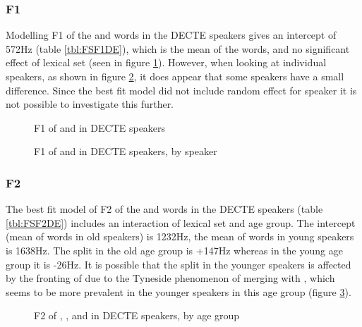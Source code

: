 \documentclass[../../../00.FullDoc/tex/ThesisSkeleton-draft2]{subfiles}
\begin{document}
\subsubsection{F1}
Modelling F1 of the \foot{} and \strutt{} words in the DECTE speakers gives an intercept of 572Hz (table \ref{tbl:FSF1DE}), which is the mean of the \foot{} words, and no significant effect of lexical set (seen in figure \ref{fig:FSF1DE}). However, when looking at individual speakers, as shown in figure \ref{fig:FSF1DE-id}, it does appear that some speakers have a small difference. Since the best fit model did not include random effect for speaker it is not possible to investigate this further.



\begin{figure}
	\centering
	
	\caption{F1 of \foot{} and \strutt{} in DECTE speakers} \label{fig:FSF1DE}
\end{figure}

\begin{figure}
	\centering
	
	\caption{F1 of \foot{} and \strutt{} in DECTE speakers, by speaker} \label{fig:FSF1DE-id}
\end{figure}


\subsubsection{F2}
The best fit model of F2 of the \foot{} and \strutt{} words in the DECTE speakers (table \ref{tbl:FSF2DE}) includes an interaction of lexical set and age group. The intercept (mean of \foot{} words in old speakers) is 1232Hz, the mean of \foot{} words in young speakers is 1638Hz. The split in the old age group is +147Hz whereas in the young age group it is -26Hz. It is possible that the split in the younger speakers is affected by the  fronting of \foot{} due to the Tyneside phenomenon of \foot{} merging with \goose{}, which seems to be more prevalent in the younger speakers in this age group (figure \ref{fig:FSGF2DE-age}).




\begin{figure}
	\centering
	
	\caption{F2 of \foot{}, \strutt{}, and \goose{} in DECTE speakers, by age group} \label{fig:FSGF2DE-age}
\end{figure}
\end{document}
